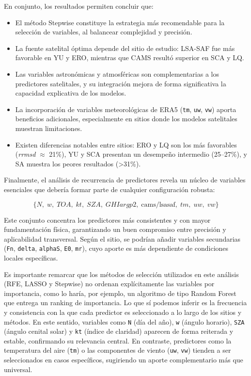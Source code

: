 En conjunto, los resultados permiten concluir que:
\begin{itemize}
    \item El método Stepwise constituye la estrategia más recomendable para la selección de variables, al balancear complejidad y precisión.
    \item La fuente satelital óptima depende del sitio de estudio: LSA-SAF fue más favorable en YU y ERO, mientras que CAMS resultó superior en SCA y LQ. 
    \item Las variables astronómicas y atmosféricas son complementarias a los predictores satelitales, y su integración mejora de forma significativa la capacidad explicativa de los modelos.
    \item La incorporación de variables meteorológicas de ERA5 (\texttt{tm}, \texttt{uw}, \texttt{vw}) aporta beneficios adicionales, especialmente en sitios donde los modelos satelitales muestran limitaciones.
    \item Existen diferencias notables entre sitios: ERO y LQ son los más favorables (\textit{rrmsd} $\approx$ 21\%), YU y SCA presentan un desempeño intermedio (25--27\%), y SA muestra los peores resultados (>31\%).
\end{itemize}

Finalmente, el análisis de recurrencia de predictores revela un núcleo de variables esenciales que debería formar parte de cualquier configuración robusta: 

\[
\{N,\; w,\; TOA,\; kt,\; SZA,\; GHIargp2,\; \text{cams/lsasaf},\; tm,\; uw,\; vw\}
\]

Este conjunto concentra los predictores más consistentes y con mayor fundamentación física, garantizando un buen compromiso entre precisión y aplicabilidad transversal. Según el sitio, se podrían añadir variables secundarias (\texttt{Fn}, \texttt{delta}, \texttt{alphaS}, \texttt{E0}, \texttt{mr}), cuyo aporte es más dependiente de condiciones locales específicas.

Es importante remarcar que los métodos de selección utilizados en este análisis (RFE, LASSO y Stepwise) no ordenan explícitamente las variables por importancia, como lo haría, por ejemplo, un algoritmo de tipo Random Forest que entrega un ranking de importancia. Lo que sí podemos inferir es la frecuencia y consistencia con la que cada predictor es seleccionado a lo largo de los sitios y métodos. En este sentido, variables como \texttt{N} (día del año), \texttt{w} (ángulo horario), \texttt{SZA} (ángulo cenital solar) y \texttt{kt} (índice de claridad) aparecen de forma reiterada y estable, confirmando su relevancia central. En contraste, predictores como la temperatura del aire (\texttt{tm}) o las componentes de viento (\texttt{uw}, \texttt{vw}) tienden a ser seleccionados en casos específicos, sugiriendo un aporte complementario más que universal.


